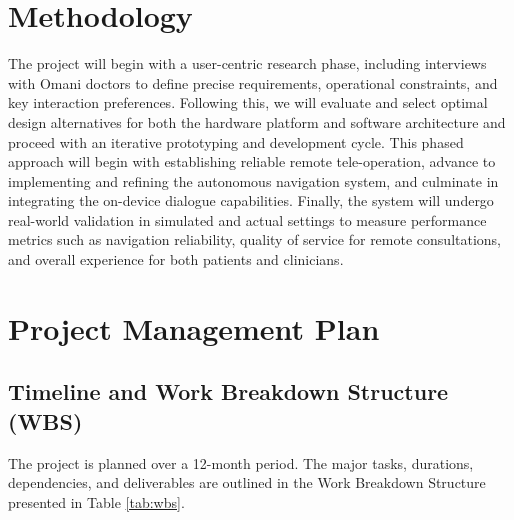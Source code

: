 \documentclass[11pt,a4paper]{article}
\begin{document}
\section{Methodology}

The project will begin with a user-centric research phase, including interviews with Omani doctors to define precise requirements, operational constraints, and key interaction preferences. Following this, we will evaluate and select optimal design alternatives for both the hardware platform and software architecture and proceed with an iterative prototyping and development cycle. This phased approach will begin with establishing reliable remote tele-operation, advance to implementing and refining the autonomous navigation system, and culminate in integrating the on-device dialogue capabilities. Finally, the system will undergo real-world validation in simulated and actual settings to measure performance metrics such as navigation reliability, quality of service for remote consultations, and overall experience for both patients and clinicians.



\section{Project Management Plan}

\subsection{Timeline and Work Breakdown Structure (WBS)}
The project is planned over a 12-month period. The major tasks, durations, dependencies, and deliverables are outlined in the Work Breakdown Structure presented in Table \ref{tab:wbs}.
\end{document}
